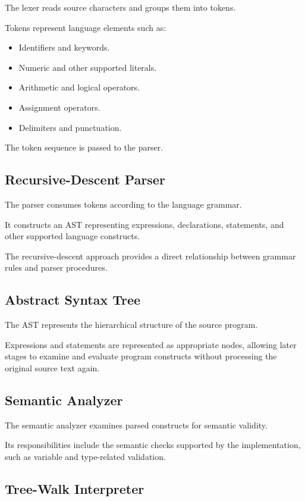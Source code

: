 \documentclass[conference]{IEEEtran}
\begin{document}
The lexer reads source characters and groups them
into tokens.

Tokens represent language elements such as:

\begin{itemize}
    \item Identifiers and keywords.
    \item Numeric and other supported literals.
    \item Arithmetic and logical operators.
    \item Assignment operators.
    \item Delimiters and punctuation.
\end{itemize}

The token sequence is passed to the parser.

\subsection{Recursive-Descent Parser}

The parser consumes tokens according to the language
grammar.

It constructs an AST representing expressions,
declarations, statements, and other supported
language constructs.

The recursive-descent approach provides a direct
relationship between grammar rules and parser
procedures.

\subsection{Abstract Syntax Tree}

The AST represents the hierarchical structure of
the source program.

Expressions and statements are represented as
appropriate nodes, allowing later stages to examine
and evaluate program constructs without processing
the original source text again.

\subsection{Semantic Analyzer}

The semantic analyzer examines parsed constructs
for semantic validity.

Its responsibilities include the semantic checks
supported by the implementation, such as variable
and type-related validation.

\subsection{Tree-Walk Interpreter}
\end{document}
